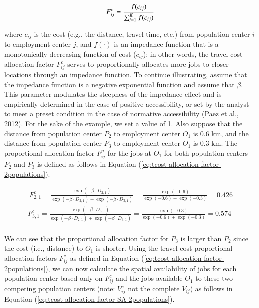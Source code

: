 \documentclass[]{elsarticle} %
\begin{document}
\begin{equation}
\label{eq:tcost-alloc-factor}
F^c_{ij} = \frac{f(c_{ij})}{\sum_{i=1}^K f(c_{ij})}\\
\end{equation}

\noindent where \(c_{ij}\) is the cost (e.g., the distance, travel time,
etc.) from population center \(i\) to employment center \(j\), and
\(f(\cdot)\) is an impedance function that is a monotonically decreasing
function of cost (\(c_{ij}\)); in other words, the travel cost
allocation factor \(F^c_{ij}\) serves to proportionally allocates more
jobs to closer locations through an impedance function. To continue
illustrating, assume that the impedance function is a negative
exponential function and assume that \(\beta\). This parameter modulates
the steepness of the impedance effect and is empirically determined in
the case of positive accessibility, or set by the analyst to meet a
preset condition in the case of normative accessibility (Paez et al.,
2012). For the sake of the example, we set a value of 1. Also suppose
that the distance from population center \(P_2\) to employment center
\(O_1\) is 0.6 km, and the distance from population center \(P_3\) to
employment center \(O_1\) is 0.3 km. The proportional allocation factor
\(F^p_{ij}\) for the jobs at \(O_1\) for both population centers \(P_2\)
and \(P_3\) is defined as follows in Equation
(\ref{eq:tcost-allocation-factor-2populations}).

\begin{equation}
\label{eq:tcost-allocation-factor-2populations}
\begin{array}{l}\
F^c_{2,1} = \frac{\exp(-\beta \cdot D_{2,1})}{\exp(-\beta \cdot D_{2,1}) + \exp(-\beta \cdot D_{3,1})} = \frac{\exp(-0.6)}{\exp(-0.6) + \exp(-0.3)} = 0.426\\
F^c_{3,1} = \frac{\exp(-\beta \cdot D_{3,1})}{\exp(-\beta \cdot D_{2,1}) + \exp(-\beta \cdot D_{3,1})}  = \frac{\exp(-0.3)}{\exp(-0.6) + \exp(-0.3)} = 0.574\\
\end{array}
\end{equation}

We can see that the proportional allocation factor for \(P_3\) is larger
than \(P_2\) since the cost (i.e., distance) to \(O_1\) is shorter.
Using the travel cost proportional allocation factors \(F^c_{ij}\) as
defined in Equation (\ref{eq:tcost-allocation-factor-2populations}), we
can now calculate the spatial availability of jobs for each population
center based only on \(F^c_{ij}\) and the jobs available \(O_1\) to
these two competing population centers (note: \(V^c_{ij}\) not the
complete \(V_{ij}\)) as follows in Equation
(\ref{eq:tcost-allocation-factor-SA-2populations}).
\end{document}
